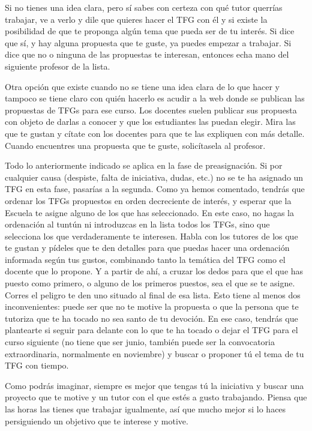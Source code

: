 Si no tienes una idea clara, pero sí sabes con certeza con qué tutor querrías trabajar, ve a verlo y dile que quieres hacer el TFG con él y si existe la posibilidad de que te proponga algún tema que pueda ser de tu interés. Si dice que sí, y hay alguna propuesta que te guste, ya puedes empezar a trabajar. Si dice que no o ninguna de las propuestas te interesan, entonces echa mano del siguiente profesor de la lista.

Otra opción que existe cuando no se tiene una idea clara de lo que hacer y tampoco se tiene claro con quién hacerlo es acudir a la web donde se publican las propuestas de TFGs para ese curso. Los docentes suelen publicar sus propuesta con objeto de darlas a conocer y que los estudiantes las puedan elegir. Mira las que te gustan y cítate con los docentes para que te las expliquen con más detalle. Cuando encuentres una propuesta que te guste, solicítasela al profesor. 

Todo lo anteriormente indicado se aplica en la fase de preasignación. Si por cualquier causa (despiste, falta de iniciativa, dudas, etc.) no se te ha asignado un TFG en esta fase, pasarías a la segunda. Como ya hemos comentado, tendrás que ordenar los TFGs propuestos en orden decreciente de interés, y esperar que la Escuela te asigne alguno de los que has seleccionado. En este caso, no hagas la ordenación al tuntún ni introduzcas en la lista todos los TFGs, sino que selecciona los que verdaderamente te interesen. Habla con los tutores de los que te gustan y pídeles que te den detalles para que puedas hacer una ordenación informada según tus gustos, combinando tanto la temática del TFG como el docente que lo propone. Y a partir de ahí, a cruzar los dedos para que el que has puesto como primero, o alguno de los primeros puestos,  sea el que se te asigne. Corres el peligro te den uno situado al final de esa lista. Esto tiene al menos dos inconvenientes: puede ser que no te motive la propuesta o que la persona que te tutoriza que te ha tocado no sea santo de tu devoción. En ese caso, tendrás que plantearte si seguir para delante con lo que te ha tocado o dejar el TFG para el curso siguiente (no tiene que ser junio, también puede ser la convocatoria extraordinaria, normalmente en noviembre) y buscar o proponer tú el tema de tu TFG con tiempo.

Como podrás imaginar, siempre es mejor que tengas tú la iniciativa y buscar una proyecto que te motive y un tutor con el que estés a gusto trabajando. Piensa que las horas las tienes que trabajar igualmente, así que mucho mejor si lo haces persiguiendo un objetivo que te interese y motive.

